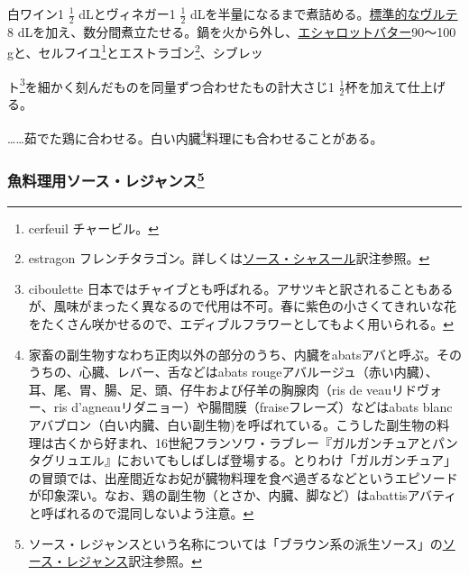\begin{recette}

 

白ワイン1 \(\frac{1}{2}\) dLとヴィネガー1 \(\frac{1}{2}\)
dLを半量になるまで煮詰める。\protect\hyperlink{veloute}{標準的なヴルテ}8
dLを加え、数分間煮立たせる。鍋を火から外し、\protect\hyperlink{beurre-d-echalote}{エシャロットバター}90〜100
gと、セルフイユ\footnote{cerfeuil チャービル。}とエストラゴン\footnote{estragon
  フレンチタラゴン。詳しくは\protect\hyperlink{sauce-chasseur}{ソース・シャスール}訳注参照。}、シブレッ

ト\footnote{ciboulette
  日本ではチャイブとも呼ばれる。アサツキと訳されることもあるが、風味がまったく異なるので代用は不可。春に紫色の小さくてきれいな花をたくさん咲かせるので、エディブルフラワーとしてもよく用いられる。}を細かく刻んだものを同量ずつ合わせたもの計大さじ1
\(\frac{1}{2}\)杯を加えて仕上げる。

\ldots{}\ldots{}茹でた鶏に合わせる。白い内臓\footnote{家畜の副生物すなわち正肉以外の部分のうち、内臓をabatsアバと呼ぶ。そのうちの、心臓、レバー、舌などはabats
  rougeアバルージュ（赤い内臓）、耳、尾、胃、腸、足、頭、仔牛および仔羊の胸腺肉（ris
  de veauリドヴォー、ris
  d'agneauリダニョー）や腸間膜（fraiseフレーズ）などはabats
  blancアバブロン（白い内臓、白い副生物)を呼ばれている。こうした副生物の料理は古くから好まれ、16世紀フランソワ・ラブレー『ガルガンチュアとパンタグリュエル』においてもしばしば登場する。とりわけ「ガルガンチュア」の冒頭では、出産間近なお妃が臓物料理を食べ過ぎるなどというエピソードが印象深い。なお、鶏の副生物（とさか、内臓、脚など）はabattisアバティと呼ばれるので混同しないよう注意。}料理にも合わせることがある。

\atoaki{}

\hypertarget{sauce-regence-pour-poissons}{%
\subsubsection[魚料理用ソース・レジャンス]{\texorpdfstring{魚料理用ソース・レジャンス\footnote{ソース・レジャンスという名称については「ブラウン系の派生ソース」の\protect\hyperlink{sauce-regence}{ソース・レジャンス}訳注参照。}}{魚料理用ソース・レジャンス}}\label{sauce-regence-pour-poissons}}



\end{recette}
